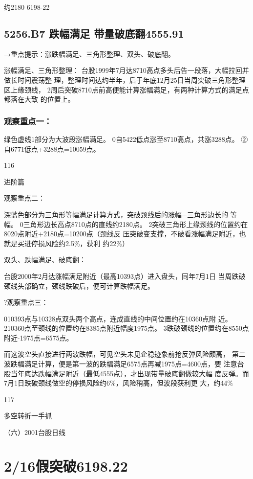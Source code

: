 \documentclass{article}
\begin{document}
约2180 6198-22

\subsection{5256.B7 跌幅满足 带量破底翻4555.91}

→重点提示：涨跌幅满足、三角形整理、双头、破底翻。

涨幅满足、三角形整理： 台股1999年7月达8710高点多头后告一段落，大幅拉回并做长时间震荡整 理，整理时间达约半年，后于年底12月25日当周突破三角形整理区上缘颈线， 2周后突破8710点前高便能计算涨幅满足，有两种计算方式的满足点都落在大致 的位置上。

\subsubsection{观察重点一：}

绿色虚线1部分为大波段涨幅满足。 0自5422低点涨至8710高点，共涨3288点。 ②自6771低点+3288点=10059点。

116

\clearpage

进阶篇

观察重点二：

深蓝色部分为三角形等幅满足计算方式，突破颈线后的涨幅=三角形边长的 等幅。 0三角形边长高点8710点的直线约2180点。 2突破三角形上缘颈线的位置约在8020点附近+2180点=10200点（颈线反 压突破变支撑，不破看涨幅满足附近，也就是买进停损风险约2.5\%，获利 约22\%）

双头、跌幅满足、破底翻：

台股2000年2月达涨幅满足附近（最高10393点）进入盘头，同年7月1日 当周跌破颈线头部确立，颈线跌破后，便可计算跌幅满足。

?观察重点三：

010393点与10328点双头两个高点，连成直线的中间位置约在10360点附 近。 210360点至颈线的位置约在8385点附近幅度1975点。 3跌破颈线的位置约在8550点附近-1975点=6575点。

而这波空头直接进行两波跌幅，可见空头未见企稳迹象前抢反弹风险颇高， 第二波跌幅满足计算，便是第一波的跌幅满足6575点再减1975点=4600点，要 注意台股当年底达跌幅满足附近（最低4555点），才出现带量破底翻做较大幅 度反弹。而7月1日跌破颈线做空的停损风险约6\%，风险稍高，但波段获利更 大，约44\%

117

\clearpage

多空转折一手抓

（六）2001台股日线

\section{2/16假突破6198.22}
\end{document}
